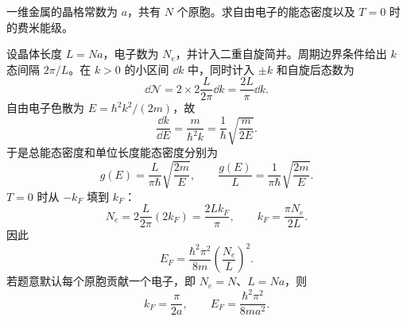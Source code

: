 \begin{question}[10 分]
一维金属的晶格常数为 $a$，共有 $N$ 个原胞。求自由电子的能态密度以及 $T=0$ 时的费米能级。


\begin{solution}
设晶体长度 $L=Na$，电子数为 $N_e$，并计入二重自旋简并。周期边界条件给出 $k$ 态间隔 $2\pi/L$。在 $k>0$ 的小区间 $\dd k$ 中，同时计入 $\pm k$ 和自旋后态数为
\[
 \dd\mathcal N=2\times2\frac{L}{2\pi}\dd k=\frac{2L}{\pi}\dd k.
\]
自由电子色散为 $E=\hbar^2k^2/(2m)$，故
\[
 \frac{\dd k}{\dd E}=\frac{m}{\hbar^2k}
 =\frac1\hbar\sqrt{\frac{m}{2E}}.
\]
于是总能态密度和单位长度能态密度分别为
\[
 \boxed{g(E)=\frac{L}{\pi\hbar}\sqrt{\frac{2m}{E}},\qquad
 \frac{g(E)}L=\frac1{\pi\hbar}\sqrt{\frac{2m}{E}}.}
\]
$T=0$ 时从 $-k_F$ 填到 $k_F$：
\[
 N_e=2\frac{L}{2\pi}(2k_F)=\frac{2Lk_F}{\pi},
 \qquad k_F=\frac{\pi N_e}{2L}.
\]
因此
\[
 \boxed{E_F=\frac{\hbar^2\pi^2}{8m}\left(\frac{N_e}{L}\right)^2.}
\]
若题意默认每个原胞贡献一个电子，即 $N_e=N$、$L=Na$，则
\[
 \boxed{k_F=\frac\pi{2a},\qquad E_F=\frac{\hbar^2\pi^2}{8ma^2}.}
\]
\end{solution}
\end{question}
